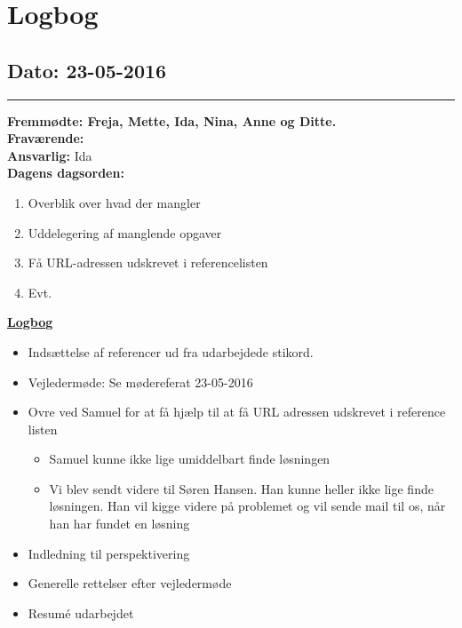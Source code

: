 \chapter{Logbog}
\section{Dato: 23-05-2016}
\hrule
\textbf{Fremmødte: Freja, Mette, Ida, Nina, Anne og Ditte.} \\
\textbf{Fraværende: } \\
\textbf{Ansvarlig:} Ida  \\
\textbf{Dagens dagsorden: }
\begin{enumerate}
	\item Overblik over hvad der mangler
	\item Uddelegering af manglende opgaver
	\item Få URL-adressen udskrevet i referencelisten
	\item Evt. 
\end{enumerate}

\underline{\textbf{Logbog}}
\begin{itemize}
\item Indsættelse af referencer ud fra udarbejdede stikord.
\item Vejledermøde: Se mødereferat 23-05-2016
\item Ovre ved Samuel for at få hjælp til at få URL adressen udskrevet i reference listen
\begin{itemize}
\item Samuel kunne ikke lige umiddelbart finde løsningen
\item Vi blev sendt videre til Søren Hansen. Han kunne heller ikke lige finde løsningen. Han vil kigge videre på problemet og vil sende mail til os, når han har fundet en løsning
\end{itemize}
\item Indledning til perspektivering
\item Generelle rettelser efter vejledermøde
\item Resumé udarbejdet
\end{itemize}

\newpage